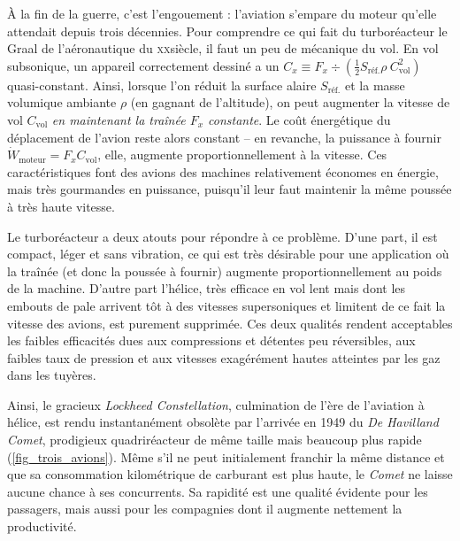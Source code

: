 À la fin de la guerre, c’est l’engouement : l’aviation s’empare du moteur qu’elle attendait depuis trois décennies. Pour comprendre ce qui fait du turboréacteur le Graal de l’aéronautique du \textsc{xx}\ieme siècle, il faut un peu de mécanique du vol. En vol subsonique, un appareil correctement dessiné a un  $C_x \equiv F_x \div \left(\frac{1}{2} S_\text{réf.} \rho \ C_\text{vol}^2\right)$ quasi-constant. Ainsi, lorsque l’on réduit la surface alaire $S_\text{réf.}$ et la masse volumique ambiante $\rho$ (en gagnant de l’altitude), on peut augmenter la vitesse de vol $C_\text{vol}$ \emph{en maintenant la traînée $F_x$ constante}. Le coût énergétique du déplacement de l’avion reste alors constant -- en revanche, la puissance à fournir $\dot W_\text{moteur} = F_x C_\text{vol}$, elle, augmente proportionnellement à la vitesse. Ces caractéristiques font des avions des machines relativement économes en énergie, mais très gourmandes en puissance, puisqu’il leur faut maintenir la même poussée à très haute vitesse.

Le turboréacteur a deux atouts pour répondre à ce problème. D’une part, il est compact, léger et sans vibration, ce qui est très désirable pour une application où la traînée (et donc la poussée à fournir) augmente proportionnellement au poids de la machine. D’autre part l’hélice, très efficace en vol lent mais dont les embouts de pale arrivent tôt à des vitesses supersoniques et limitent de ce fait la vitesse des avions, est purement supprimée. Ces deux qualités rendent acceptables les faibles efficacités dues aux compressions et détentes peu réversibles, aux faibles taux de pression et aux vitesses exagérément hautes atteintes par les gaz dans les tuyères.

Ainsi, le gracieux \textit{Lockheed Constellation}, culmination de l’ère de l’aviation à hélice, est rendu instantanément obsolète par l’arrivée en 1949 du \textit{De Havilland Comet}, prodigieux quadriréacteur de même taille mais beaucoup plus rapide (\cref{fig_trois_avions}). Même s’il ne peut initialement franchir la même distance et que sa consommation kilométrique de carburant est plus haute, le \textit{Comet} ne laisse aucune chance à ses concurrents. Sa rapidité est une qualité évidente pour les passagers, mais aussi pour les compagnies dont il augmente nettement la productivité.

